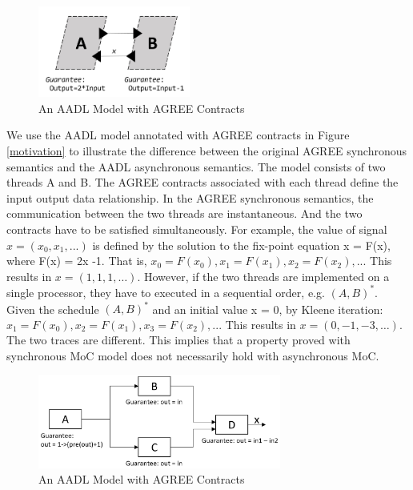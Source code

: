 \begin{figure}[ht!]
\centering
\includegraphics[width=50mm]{motivation.jpg}
\caption{An AADL Model with AGREE Contracts\label{motivationFig1}}
\end{figure}

We use the AADL model annotated with AGREE contracts in Figure \ref{motivation} to illustrate the difference between the original AGREE synchronous semantics and the AADL asynchronous semantics. The model consists of two threads A and B. The AGREE contracts associated with each thread define the input output data relationship. In the AGREE synchronous semantics, the communication between the two threads are instantaneous. And the two contracts have to be satisfied simultaneously. For example, the value of signal $x = (x_0, x_1, ...)$ is defined by the solution to the fix-point equation x = F(x), where F(x) = 2x -1. That is, $x_0 = F(x_0), x_1 = F(x_1), x_2 = F(x_2), ...$ This results in $x = (1,1,1,…)$. However, if the two threads are implemented on a single processor, they have to executed in a sequential order, e.g. $(A,B)^*$. 
Given the schedule $(A,B)^*$ and an initial value x = 0,  by Kleene iteration: $x_1 = F(x_0), x_2 = F(x_1), x_3 = F(x_2),...$ This results in $x = (0,-1,-3,…)$. The two traces are different. This implies that a property proved with synchronous MoC model does not necessarily hold with asynchronous MoC. 

\begin{figure}[ht!]
\centering
\includegraphics[width=80mm]{MotivationalExample1.jpg}
\caption{An AADL Model with AGREE Contracts\label{motivationFig2}}
\end{figure}


